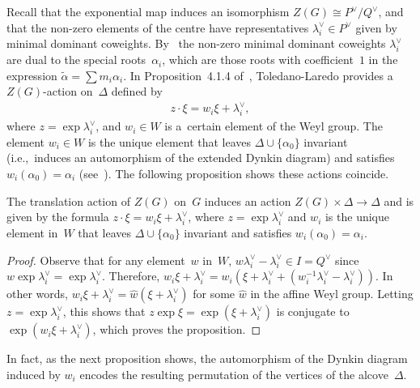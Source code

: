 Recall that the exponential map induces an isomorphism $Z(G)\cong P^\vee/Q^\vee$, and that the non-zero elements of the
centre have representatives $\lambda_i^\vee \in P^\vee$ given by minimal dominant coweights.
By~\cite[Lemma~2.3]{TL} the non-zero minimal dominant coweights $\lambda_i^\vee$ are dual to the special roots~$\alpha_i$, which are those roots with coef\/f\/icient~$1$ in the expression $\tilde{\alpha}=\sum m_i\alpha_i$.
In Proposition~4.1.4 of~\cite{TL}, Toledano-Laredo provides a~$Z(G)$-action on~$\Delta$ def\/ined by
\begin{gather*}
z\cdot \xi = w_i \xi + \lambda_i^\vee,
\end{gather*}
where $z=\exp \lambda_i^\vee$, and $w_i \in W$ is a~certain element of the Weyl group.
The element $w_i \in W$ is the unique element that leaves $\Delta \cup \{{\alpha_0} \}$ invariant (i.e.,~induces an
automorphism of the extended Dynkin diagram) and satisf\/ies $w_i({\alpha_0}) = \alpha_i$ (see~\cite[Proposition 4.1.2]{TL}).
The following proposition shows these actions coincide.

\begin{Proposition}
\label{prop:action}
The translation action of $Z(G)$ on~$G$ induces an action $Z(G) \times \Delta \to \Delta$ and is given by the formula
$z\cdot \xi = w_i \xi + \lambda_i^\vee$, where $z=\exp \lambda_i^\vee$ and $w_i$ is the unique element in~$W$ that
leaves $\Delta \cup \{{\alpha_0} \}$ invariant and satisfies $w_i({\alpha_0}) = \alpha_i$.
\end{Proposition}

\begin{proof}
Observe that for any element~$w$ in~$W$, $w \lambda_i^\vee - \lambda_i^\vee \in I= Q^\vee$ since $w\exp\lambda_i^\vee =
\exp \lambda_i^\vee$.
Therefore, $w_i \xi + \lambda_i^\vee = w_i(\xi + \lambda_i^\vee + (w_i^{-1}\lambda_i^\vee - \lambda_i^\vee))$.
In other words, $w_i \xi + \lambda_i^\vee = \hat{w}(\xi+\lambda_i^\vee)$ for some $\hat{w}$ in the af\/f\/ine Weyl group.
Letting $z=\exp\lambda_i^\vee$, this shows that $z \exp \xi = \exp(\xi+\lambda_i^\vee)$ is conjugate to $\exp(w_i \xi
+\lambda^\vee_i)$, which proves the proposition.
\end{proof}

In fact, as the next proposition shows, the automorphism of the Dynkin diagram induced by $w_i$ encodes the resulting
permutation of the vertices of the alcove~$\Delta$.

